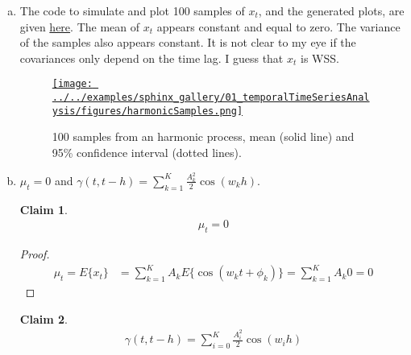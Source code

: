 \documentclass[12pt]{article}
\newtheorem{claim}{Claim}
\begin{document}
\begin{enumerate}[(a)]

    \item The code to simulate and plot 100 samples of $x_t$, and the generated
        plots, are given
        \href{https://joacorapela.github.io/statNeuro2025/auto_examples/01_temporalTimeSeriesAnalysis/plot_samplesHarmonicProcess.html#sphx-glr-auto-examples-01-temporaltimeseriesanalysis-plot-samplesharmonicprocess-py}{here}. The mean of $x_t$ appears constant and
        equal to zero. The variance of the samples also appears constant. It is not
        clear to my eye if the covariances only depend on the time lag. I guess
        that $x_t$ is WSS.

        \begin{figure}
            \begin{center}
                \href{https://www.gatsby.ucl.ac.uk/~rapela/statNeuro/2025/lectures/01_temporalTimeSeriesAnalysis/figures/harmonicSamples.html}{\texttt{[image: ../../examples/sphinx\_gallery/01\_temporalTimeSeriesAnalysis/figures/harmonicSamples.png]}}
                \caption{100 samples from an harmonic process, mean (solid line) and 95\% confidence interval (dotted lines).}
                \label{fig:harmonicProcessSamples}
            \end{center}
        \end{figure}

    \item $\mu_t=0$ and $\gamma(t,t-h)=\sum_{k=1}^K\frac{A_k^2}{2}\cos(w_kh)$.

        \begin{claim}
            \begin{align}
                \mu_t=0
            \end{align}
        \end{claim}

        \begin{proof}
            \begin{align}
                \mu_t=E\{x_t\}&=\sum_{k=1}^KA_kE\{\cos(w_kt+\phi_k)\}=\sum_{k=1}^KA_k0=0
            \end{align}
        \end{proof}

        \begin{claim}
            \begin{align}
                \gamma(t, t-h)=\sum_{i=0}^K\frac{A_i^2}{2}\cos(w_ih)
            \end{align}
        \end{claim}


\end{enumerate}
\end{document}

